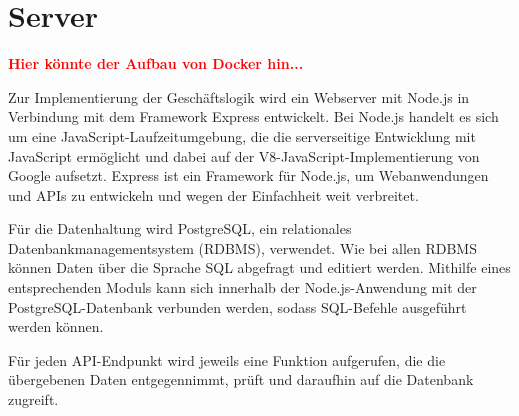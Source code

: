 \section{Server}

\textcolor{red}{\textbf{Hier könnte der Aufbau von Docker hin...}}

Zur Implementierung der Geschäftslogik wird ein Webserver mit Node.js in Verbindung mit dem Framework Express entwickelt.
Bei Node.js handelt es sich um eine JavaScript-Laufzeitumgebung, die die serverseitige Entwicklung mit JavaScript ermöglicht und dabei auf der V8-JavaScript-Implementierung von Google aufsetzt.\autocite[Vgl.][]{nl-openjsfoundation2020nodejs}
Express ist ein Framework für Node.js, um Webanwendungen und \acsp{API} zu entwickeln und wegen der Einfachheit weit verbreitet.\autocite[Vgl.][]{nl-strongloop2017express}

Für die Datenhaltung wird PostgreSQL, ein relationales Datenbankmanagementsystem (RDBMS), verwendet. %
Wie bei allen RDBMS können Daten über die Sprache \acs{SQL} abgefragt und editiert werden.
Mithilfe eines entsprechenden Moduls kann sich innerhalb der Node.js-Anwendung mit der PostgreSQL-Datenbank verbunden werden, sodass \acs{SQL}-Befehle ausgeführt werden können.\autocite[Vgl.][]{nl-carlson2020nodepostgres}

Für jeden \acs{API}-Endpunkt wird jeweils eine Funktion aufgerufen, die die übergebenen Daten entgegennimmt, prüft und daraufhin auf die Datenbank zugreift.
